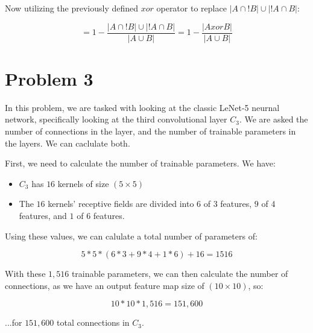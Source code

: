 \documentclass{article}
\begin{document}
\noindent Now utilizing the previously defined $\textit{xor}$ operator to replace $|A \cap ! B | \cup |!A \cap B|$:

\begin{equation}
    = 1 - \frac{|A \cap ! B | \cup |!A \cap B|}{|A \cup B|} = 1 - \frac{|A \textit{xor} B|}{|A \cup B|}
\end{equation}


\section*{Problem 3}

In this problem, we are tasked with looking at the classic LeNet-5 neurnal network, specifically looking at the third convolutional layer $C_3$. We are asked the number of connections in the layer, and the number of trainable parameters in the layers. We can caclulate both.

\noindent First, we need to calculate the number of trainable parameters. We have:

\begin{itemize}
    \item $C_3$ has $16$ kernels of size $(5 \times 5)$
    \item The $16$ kernels' receptive fields are divided into $6$ of $3$ features, $9$ of $4$ features, and $1$ of $6$ features.
\end{itemize}

\noindent Using these values, we can calulate a total number of parameters of:

\begin{equation}
    5*5*(6*3 + 9*4 + 1*6) + 16 = 1516
\end{equation}

\noindent With these $1,516$ trainable parameters, we can then calculate the number of connections, as we have an output feature map size of $(10 \times 10)$, so:

\begin{equation}
    10 * 10 * 1,516 = 151,600
\end{equation}

\noindent ...for $151,600$ total connections in $C_3$.
\end{document}

